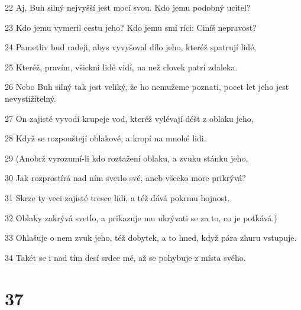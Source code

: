 \par 22 Aj, Buh silný nejvyšší jest mocí svou. Kdo jemu podobný ucitel?
\par 23 Kdo jemu vymeril cestu jeho? Kdo jemu smí ríci: Ciníš nepravost?
\par 24 Pametliv bud radeji, abys vyvyšoval dílo jeho, kteréž spatrují lidé,
\par 25 Kteréž, pravím, všickni lidé vidí, na než clovek patrí zdaleka.
\par 26 Nebo Buh silný tak jest veliký, že ho nemužeme poznati, pocet let jeho jest nevystižitelný.
\par 27 On zajisté vyvodí krupeje vod, kteréž vylévají déšt z oblaku jeho,
\par 28 Když se rozpouštejí oblakové, a kropí na mnohé lidi.
\par 29 (Anobrž vyrozumí-li kdo roztažení oblaku, a zvuku stánku jeho,
\par 30 Jak rozprostírá nad ním svetlo své, aneb všecko more prikrývá?
\par 31 Skrze ty veci zajisté tresce lidi, a též dává pokrmu hojnost.
\par 32 Oblaky zakrývá svetlo, a prikazuje mu ukrývati se za to, co je potkává.)
\par 33 Ohlašuje o nem zvuk jeho, též dobytek, a to hned, když pára zhuru vstupuje.
\par 34 Takét se i nad tím desí srdce mé, až se pohybuje z místa svého.

\chapter{37}

